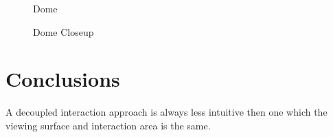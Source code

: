 \documentclass[review,journal]{vgtc}         %
\begin{document}
\begin{figure}[htb]
	\centering
	\caption{Dome}
	\label{img:dome_clip}
\end{figure}

\begin{figure}[htb]
	\centering
	\caption{Dome Closeup}
	\label{img:dome_tf_change}
\end{figure}

\section{Conclusions}\label{sec:conclusion}

A decoupled interaction approach is always less intuitive then one which the viewing surface and interaction area is the same.
\end{document}
